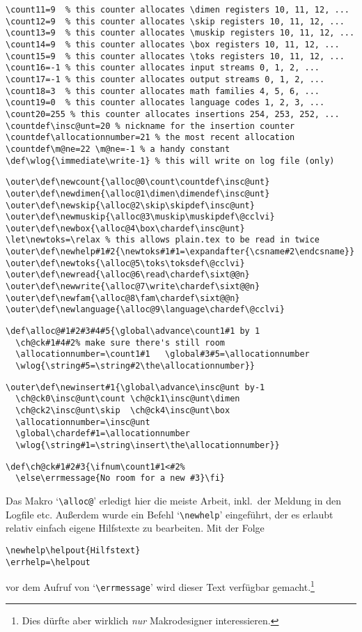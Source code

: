 \begin{appendix}
\begin{verbatim}
\count11=9  % this counter allocates \dimen registers 10, 11, 12, ...
\count12=9  % this counter allocates \skip registers 10, 11, 12, ...
\count13=9  % this counter allocates \muskip registers 10, 11, 12, ...
\count14=9  % this counter allocates \box registers 10, 11, 12, ...
\count15=9  % this counter allocates \toks registers 10, 11, 12, ...
\count16=-1 % this counter allocates input streams 0, 1, 2, ...
\count17=-1 % this counter allocates output streams 0, 1, 2, ...
\count18=3  % this counter allocates math families 4, 5, 6, ...
\count19=0  % this counter allocates language codes 1, 2, 3, ...
\count20=255 % this counter allocates insertions 254, 253, 252, ...
\countdef\insc@unt=20 % nickname for the insertion counter
\countdef\allocationnumber=21 % the most recent allocation
\countdef\m@ne=22 \m@ne=-1 % a handy constant
\def\wlog{\immediate\write-1} % this will write on log file (only)
\end{verbatim}
\begin{verbatim}
\outer\def\newcount{\alloc@0\count\countdef\insc@unt}
\outer\def\newdimen{\alloc@1\dimen\dimendef\insc@unt}
\outer\def\newskip{\alloc@2\skip\skipdef\insc@unt}
\outer\def\newmuskip{\alloc@3\muskip\muskipdef\@cclvi}
\outer\def\newbox{\alloc@4\box\chardef\insc@unt}
\let\newtoks=\relax % this allows plain.tex to be read in twice
\outer\def\newhelp#1#2{\newtoks#1#1=\expandafter{\csname#2\endcsname}}
\outer\def\newtoks{\alloc@5\toks\toksdef\@cclvi}
\outer\def\newread{\alloc@6\read\chardef\sixt@@n}
\outer\def\newwrite{\alloc@7\write\chardef\sixt@@n}
\outer\def\newfam{\alloc@8\fam\chardef\sixt@@n}
\outer\def\newlanguage{\alloc@9\language\chardef\@cclvi}
\end{verbatim}
\begin{verbatim}
\def\alloc@#1#2#3#4#5{\global\advance\count1#1 by 1
  \ch@ck#1#4#2% make sure there's still room
  \allocationnumber=\count1#1   \global#3#5=\allocationnumber
  \wlog{\string#5=\string#2\the\allocationnumber}}
\end{verbatim}
\begin{verbatim}
\outer\def\newinsert#1{\global\advance\insc@unt by-1
  \ch@ck0\insc@unt\count \ch@ck1\insc@unt\dimen
  \ch@ck2\insc@unt\skip  \ch@ck4\insc@unt\box
  \allocationnumber=\insc@unt
  \global\chardef#1=\allocationnumber
  \wlog{\string#1=\string\insert\the\allocationnumber}}
\end{verbatim}
\begin{verbatim}
\def\ch@ck#1#2#3{\ifnum\count1#1<#2%
  \else\errmessage{No room for a new #3}\fi}
\end{verbatim}
Das Makro `\verb|\alloc@|' erledigt hier die meiste Arbeit, inkl.\ der
Meldung in den Logfile etc. Au\ss{}erdem wurde ein Befehl `\verb|\newhelp|'
eingef\"uhrt, der es erlaubt relativ einfach eigene Hilfstexte zu
bearbeiten. Mit der Folge
\begin{verbatim}
\newhelp\helpout{Hilfstext}
\errhelp=\helpout
\end{verbatim}
vor dem Aufruf von `\verb|\errmessage|' wird dieser Text verf\"ugbar
gemacht.\footnote{Dies d\"urfte aber wirklich {\em nur} Makrodesigner
interessieren.}


\end{appendix}
